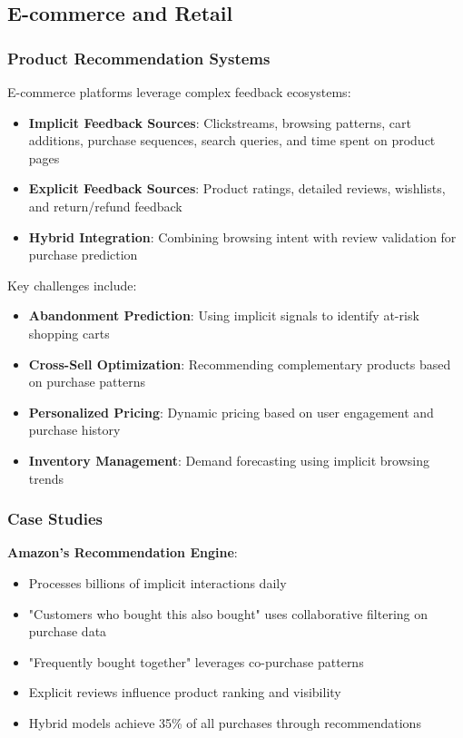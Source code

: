 \subsection{E-commerce and Retail}

\subsubsection{Product Recommendation Systems}

E-commerce platforms leverage complex feedback ecosystems:

\begin{itemize}
    \item \textbf{Implicit Feedback Sources}: Clickstreams, browsing patterns, cart additions, purchase sequences, search queries, and time spent on product pages
    \item \textbf{Explicit Feedback Sources}: Product ratings, detailed reviews, wishlists, and return/refund feedback
    \item \textbf{Hybrid Integration}: Combining browsing intent with review validation for purchase prediction
\end{itemize}

Key challenges include:
\begin{itemize}
    \item \textbf{Abandonment Prediction}: Using implicit signals to identify at-risk shopping carts
    \item \textbf{Cross-Sell Optimization}: Recommending complementary products based on purchase patterns
    \item \textbf{Personalized Pricing}: Dynamic pricing based on user engagement and purchase history
    \item \textbf{Inventory Management}: Demand forecasting using implicit browsing trends
\end{itemize}

\subsubsection{Case Studies}

\textbf{Amazon's Recommendation Engine}:
\begin{itemize}
    \item Processes billions of implicit interactions daily
    \item "Customers who bought this also bought" uses collaborative filtering on purchase data
    \item "Frequently bought together" leverages co-purchase patterns
    \item Explicit reviews influence product ranking and visibility
    \item Hybrid models achieve 35\% of all purchases through recommendations
\end{itemize}

